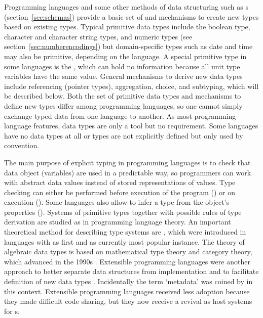 Programming languages and some other methods of data structuring such as
s (section~\ref{sec:schemas}) provide a basic set of
 and mechanisms to create new types based on
existing types. Typical primitive data types include the boolean type,
character and character string types, and numeric types (see
section~\ref{sec:numberencodings}) but domain-specific types such as date and
time may also be primitive, depending on the language. A special primitive type
in some languages is the , which can hold no information
because all unit type variables have the same value. General mechanisms to
derive new data types include referencing (pointer types), aggregation, choice,
and subtyping, which will be described below. Both the set of primitive data
types and mechanisms to define new types differ among programming languages, so
one cannot simply exchange typed data from one language to another. As most
programming language features, data types are only a tool but no requirement.
Some languages have no data types at all or types are not explicitly defined
but only used by convention.

The main purpose of explicit typing in programming languages is to check that
data object (variables) are used in a predictable way, so programmers can work
with abstract data values instead of stored representations of values. Type
checking can either be performed before execution of the program () or on execution (). Some languages also allow to
infer a type from the object's properties ().  Systems of
primitive types together with possible rules of type derivation are studied as
 in programming language theory. An important
theoretical method for describing type systems are , which were introduced in  languages with  as first \cite{Burstall1980} and
 as currently most popular instance.  The theory of algebraic
data types is based on mathematical type theory and category theory, which
advanced in the 1990s \cite{Pierce2002}.  Extensible programming languages were
another approach to better separate data structures from implementation and to
facilitate definition of new data types
\cite{Balzer1967,Schuman1970,Solntseff1974}. Incidentally the term `metadata'
was coined by \textcite{Bagley1968} in this context. Extensible programming
languages received less adoption because they made difficult code sharing, but
they now receive a revival as host systems for s. 

